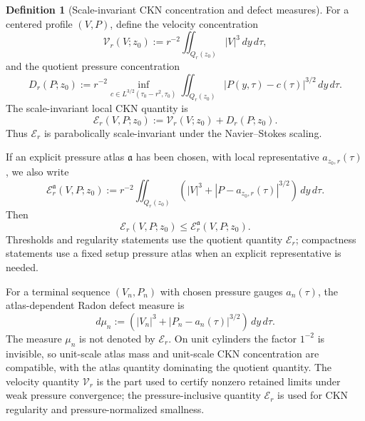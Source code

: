 \documentclass[11pt]{amsart}
\numberwithin{equation}{section}
\theoremstyle{plain}
\theoremstyle{definition}
\newtheorem{definition}[definition]{Definition}
\theoremstyle{remark}
\newcommand{\calE}{\mathcal E}
\newcommand{\Vel}{\mathcal V}
\begin{document}
\begin{definition}[Scale-invariant CKN concentration and defect measures]
\label{def:local-critical-quantity}
For a centered profile \((V,P)\), define the velocity concentration
\begin{equation}\label{eq:velocity-activity-main}
   \Vel_r(V;z_0)
   :=
   r^{-2}\iint_{Q_r(z_0)} |V|^3\,dy\,d\tau,
\end{equation}
and the quotient pressure concentration
\begin{equation}\label{eq:pressure-activity-main}
   D_r(P;z_0)
   :=
   r^{-2}
   \inf_{c\in L^{3/2}(\tau_0-r^2,\tau_0)}
   \iint_{Q_r(z_0)}
      |P(y,\tau)-c(\tau)|^{3/2}\,dy\,d\tau .
\end{equation}
The scale-invariant local CKN quantity is
\begin{equation}\label{eq:local-energy-main}
   \calE_r(V,P;z_0):=\Vel_r(V;z_0)+D_r(P;z_0).
\end{equation}
Thus \(\calE_r\) is parabolically scale-invariant under the Navier--Stokes
scaling.

If an explicit pressure atlas \(\mathfrak a\) has been chosen, with local
representative \(a_{z_0,r}(\tau)\), we also write
\begin{equation}\label{eq:atlas-dependent-activity-main}
   \calE_r^{\mathfrak a}(V,P;z_0)
   :=
   r^{-2}
   \iint_{Q_r(z_0)}
      \left(|V|^3+|P-a_{z_0,r}(\tau)|^{3/2}\right)\,dy\,d\tau .
\end{equation}
Then
\[
   \calE_r(V,P;z_0)\le \calE_r^{\mathfrak a}(V,P;z_0).
\]
Thresholds and regularity statements use the quotient quantity \(\calE_r\);
compactness statements use a fixed setup pressure atlas when an explicit
representative is needed.

For a terminal sequence \((V_n,P_n)\) with chosen pressure gauges \(a_n(\tau)\),
the atlas-dependent Radon defect measure is
\begin{equation}\label{eq:raw-defect-measure-main}
   d\mu_n
   :=
   \left(|V_n|^3+|P_n-a_n(\tau)|^{3/2}\right)\,dy\,d\tau .
\end{equation}
The measure \(\mu_n\) is not denoted by \(\calE_r\).  On unit cylinders the
factor \(1^{-2}\) is invisible, so unit-scale atlas mass and
unit-scale CKN concentration are compatible, with the atlas quantity dominating the
quotient quantity.
The velocity quantity \(\Vel_r\) is the part used to certify nonzero retained
limits under weak pressure convergence; the pressure-inclusive quantity
\(\calE_r\) is used for CKN regularity and pressure-normalized smallness.
\end{definition}
\end{document}
